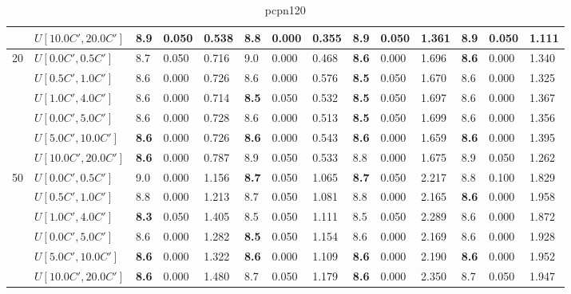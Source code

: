 \begin{table}[h]
{\begin{tabular}{|l|l||l|l|l||l|l|l||l|l|l||l|l|l|}
       & $U[10.0C',20.0C']$ & 8.9 & 0.050 & 0.538 & \textbf{8.8} & 0.000 & 0.355 & 8.9 & 0.050 & 1.361 & 8.9 & 0.050 & 1.111 \\
      \hline\hline
      \multirow{6}{*}{20} & $U[0.0C',0.5C']$ & 8.7 & 0.050 & 0.716 & 9.0 & 0.000 & 0.468 & \textbf{8.6} & 0.000 & 1.696 & \textbf{8.6} & 0.000 & 1.340 \\
       & $U[0.5C',1.0C']$ & 8.6 & 0.000 & 0.726 & 8.6 & 0.000 & 0.576 & \textbf{8.5} & 0.050 & 1.670 & 8.6 & 0.000 & 1.325 \\
       & $U[1.0C',4.0C']$ & 8.6 & 0.000 & 0.714 & \textbf{8.5} & 0.050 & 0.532 & \textbf{8.5} & 0.050 & 1.697 & 8.6 & 0.000 & 1.367 \\
       & $U[0.0C',5.0C']$ & 8.6 & 0.000 & 0.728 & 8.6 & 0.000 & 0.513 & \textbf{8.5} & 0.050 & 1.699 & 8.6 & 0.000 & 1.356 \\
       & $U[5.0C',10.0C']$ & \textbf{8.6} & 0.000 & 0.726 & \textbf{8.6} & 0.000 & 0.543 & \textbf{8.6} & 0.000 & 1.659 & \textbf{8.6} & 0.000 & 1.395 \\
       & $U[10.0C',20.0C']$ & \textbf{8.6} & 0.000 & 0.787 & 8.9 & 0.050 & 0.533 & 8.8 & 0.000 & 1.675 & 8.9 & 0.050 & 1.262 \\
      \hline\hline
      \multirow{6}{*}{50} & $U[0.0C',0.5C']$ & 9.0 & 0.000 & 1.156 & \textbf{8.7} & 0.050 & 1.065 & \textbf{8.7} & 0.050 & 2.217 & 8.8 & 0.100 & 1.829 \\
       & $U[0.5C',1.0C']$ & 8.8 & 0.000 & 1.213 & 8.7 & 0.050 & 1.081 & 8.8 & 0.000 & 2.165 & \textbf{8.6} & 0.000 & 1.958 \\
       & $U[1.0C',4.0C']$ & \textbf{8.3} & 0.050 & 1.405 & 8.5 & 0.050 & 1.111 & 8.5 & 0.050 & 2.289 & 8.6 & 0.000 & 1.872 \\
       & $U[0.0C',5.0C']$ & 8.6 & 0.000 & 1.282 & \textbf{8.5} & 0.050 & 1.154 & 8.6 & 0.000 & 2.169 & 8.6 & 0.000 & 1.928 \\
       & $U[5.0C',10.0C']$ & \textbf{8.6} & 0.000 & 1.322 & \textbf{8.6} & 0.000 & 1.109 & \textbf{8.6} & 0.000 & 2.190 & \textbf{8.6} & 0.000 & 1.952 \\
       & $U[10.0C',20.0C']$ & \textbf{8.6} & 0.000 & 1.480 & 8.7 & 0.050 & 1.179 & \textbf{8.6} & 0.000 & 2.350 & 8.7 & 0.050 & 1.947 \\
      \hline
      \end{tabular}
      }
      \caption{pcpn120}
      \label{tab:pcpn120ILPVariant}\end{table}

\clearpage
      

